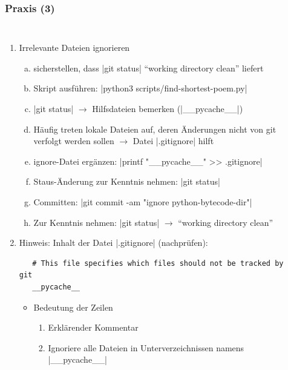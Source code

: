 \documentclass{beamer}
\begin{document}
\begin{frame}[fragile,label=uebung30]
\frametitle{Praxis (3)}
\begin{columns}
\begin{enumerate}
 \setcounter{enumi}{\value{taskcounter}}

  \item Irrelevante Dateien ignorieren
  \begin{enumerate}[a)]
   \item sicherstellen, dass \cverb|git status| "`working directory clean"' liefert
   \item Skript ausführen: \cverb|python3 scripts/find-shortest-poem.py|
   \item \cverb|git status| $\rightarrow$ Hilfsdateien bemerken (\cverb|__pycache__|)
   \item[] {\scriptsize Häufig treten lokale Dateien auf, deren Änderungen nicht von git verfolgt werden sollen
   $\rightarrow$ Datei \cverb|.gitignore| hilft}
   \item ignore-Datei ergänzen: \cverb|printf "__pycache__" >> .gitignore|
   \item Staus-Änderung zur Kenntnis nehmen: \cverb|git status|
   \item Committen: \cverb|git commit -am "ignore python-bytecode-dir"|
\smallskip
   \item Zur Kenntnis nehmen: \cverb|git status| $\rightarrow$ "`working directory clean"'
  \end{enumerate}
  \item[] Hinweis: Inhalt der Datei \cverb|.gitignore| (nachprüfen):
  {\scriptsize
  \begin{verbatim}
   # This file specifies which files should not be tracked by git
   __pycache__
  \end{verbatim}
  }
  \vspace{-3mm}
  \begin{itemize}
  \item Bedeutung der Zeilen
  \begin{enumerate}
   \item Erklärender Kommentar
   \item Ignoriere alle Dateien in Unterverzeichnissen namens \cverb|__pycache__|
  \end{enumerate}

  \end{itemize}
 \setcounter{taskcounter}{\value{enumi}}
\end{enumerate}
  ~
\end{columns}
\end{frame}
\end{document}
